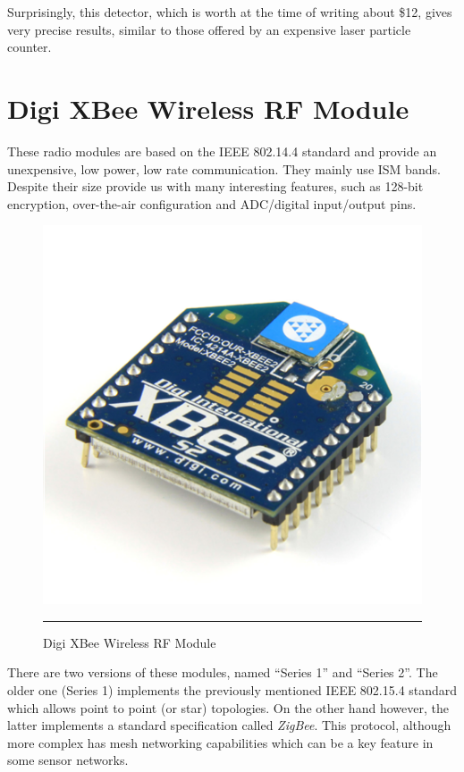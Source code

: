 Surprisingly, this detector, which is worth at the time of writing about \$12, gives very precise results, similar to those offered by an expensive laser particle counter.\citep{airquality}



\section{Digi XBee\textregistered{} Wireless RF Module}

These radio modules are based on the IEEE 802.14.4 standard and provide an unexpensive, low power, low rate communication. They mainly use ISM bands. Despite their size provide us with many interesting features, such as 128-bit encryption, over-the-air configuration and ADC/digital input/output pins\citep{xbeedatasheet}.

\begin{figure}[htbp]
    \centering
    \includegraphics[scale=0.4]{./Figures/xbee.png}
        \rule{35em}{0.5pt}
        \caption[Digi XBee RF Module]{Digi XBee\textregistered{} Wireless RF Module}
    \label{fig:XBee RF Module}
\end{figure}

There are two versions of these modules, named ``Series 1'' and ``Series 2''. The older one (Series 1) implements the previously mentioned IEEE 802.15.4 standard which allows point to point (or star) topologies. On the other hand however, the latter implements a standard specification called \emph{ZigBee}. This protocol, although more complex has mesh networking capabilities which can be a key feature in some sensor networks.

